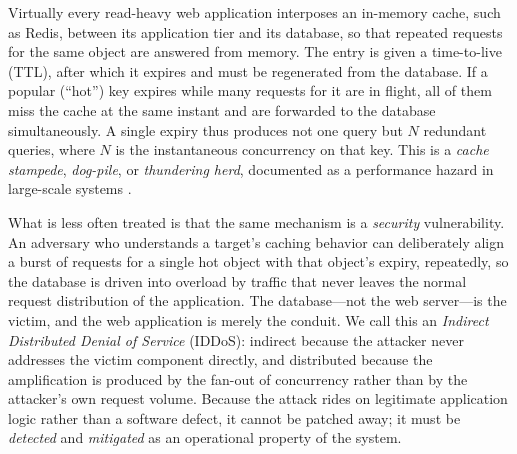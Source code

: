 \documentclass[conference]{IEEEtran}
\begin{document}
Virtually every read-heavy web application interposes an in-memory cache, such as
Redis, between its application tier and its database, so that repeated requests for
the same object are answered from memory. The entry is given a time-to-live (TTL),
after which it expires and must be regenerated from the database. If a popular
(``hot'') key expires while many requests for it are in flight, all of them miss the
cache at the same instant and are forwarded to the database simultaneously. A single
expiry thus produces not one query but $N$ redundant queries, where $N$ is the
instantaneous concurrency on that key. This is a \emph{cache stampede},
\emph{dog-pile}, or \emph{thundering herd}, documented as a performance hazard in
large-scale systems \cite{vattani2015,nishtala2013}.

What is less often treated is that the same mechanism is a \emph{security}
vulnerability. An adversary who understands a target's caching behavior can
deliberately align a burst of requests for a single hot object with that object's
expiry, repeatedly, so the database is driven into overload by traffic that never
leaves the normal request distribution of the application. The database---not the web
server---is the victim, and the web application is merely the conduit. We call this an
\emph{Indirect Distributed Denial of Service} (IDDoS): indirect because the attacker
never addresses the victim component directly, and distributed because the
amplification is produced by the fan-out of concurrency rather than by the attacker's
own request volume. Because the attack rides on legitimate application logic rather
than a software defect, it cannot be patched away; it must be \emph{detected} and
\emph{mitigated} as an operational property of the system.
\end{document}
